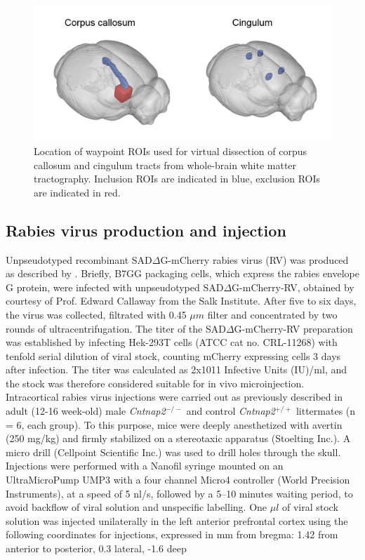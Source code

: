 \begin{figure}[th] 
    \centering
    \includegraphics[scale=0.7]{figures/cntnap2_figure_s3.png}
    \decoRule
    \caption[Location of waypoint ROIs used for virtual dissection of
    corpus callosum and cingulum tracts from whole-brain white matter
    tractography.]{Location of waypoint ROIs used for virtual dissection of
    corpus callosum and cingulum tracts from whole-brain white matter
    tractography. Inclusion ROIs are indicated in blue, exclusion ROIs are
    indicated in red.}
    \label{fig:cntnap2_figs3}
\end{figure}

\subsection{Rabies virus production and injection}

Unpseudotyped recombinant SAD$\Delta$G-mCherry rabies virus (RV) was produced as
described by \textcite{osakada2013}. Briefly, B7GG packaging cells,
which express the rabies envelope G protein, were infected with unpseudotyped
SAD$\Delta$G-mCherry-RV, obtained by courtesy of Prof. Edward Callaway from the Salk
Institute. After five to six days, the virus was collected, filtrated with 0.45
$\mu m$ filter and concentrated by two rounds of ultracentrifugation. The titer of
the SAD$\Delta$G-mCherry-RV preparation was established by infecting Hek-293T cells
(ATCC cat no. CRL-11268) with tenfold serial dilution of viral stock, counting
mCherry expressing cells 3 days after infection. The titer was calculated as
2x1011 Infective Units (IU)/ml, and the stock was therefore considered suitable
for in vivo microinjection. Intracortical rabies virus injections were carried
out as previously described \parencite{sforazzini2016} in adult (12-16 week-old)
male \textit{Cntnap2}$^{-/-}$ and control \textit{Cntnap2}$^{+/+}$ littermates (n = 6, each group). To this
purpose, mice were deeply anesthetized with avertin (250 mg/kg) and firmly
stabilized on a stereotaxic apparatus (Stoelting Inc.). A micro drill (Cellpoint
Scientific Inc.) was used to drill holes through the skull. Injections were
performed with a Nanofil syringe mounted on an UltraMicroPump UMP3 with a four
channel Micro4 controller (World Precision Instruments), at a speed of 5 nl/s,
followed by a 5–10 minutes waiting period, to avoid backflow of viral solution
and unspecific labelling. One $\mu l$ of viral stock solution was injected
unilaterally in the left anterior prefrontal cortex using the following
coordinates for injections, expressed in mm from bregma: 1.42 from anterior to
posterior, 0.3 lateral, -1.6 deep \parencite{paxinos2004} 


